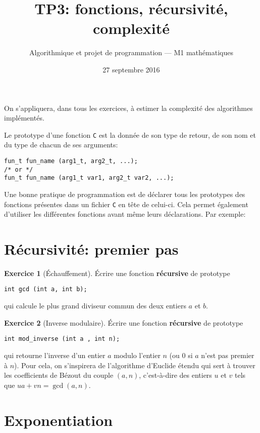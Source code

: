 \documentclass[french,a4paper]{article}
\title{\sffamily TP3: fonctions, récursivité, complexité}%
\date{27 septembre 2016}%
\author{Algorithmique et projet de programmation --- M1
  mathématiques}%
\theoremstyle{definition}
\newtheorem{exercise}{Exercice}
\theoremstyle{remark}
\begin{document}
\maketitle

On s'appliquera, dans tous les exercices, à estimer la complexité des
algorithmes implémentés.

\medskip

Le prototype d'une fonction {\tt C} est la donnée de son type de
retour, de son nom et du type de chacun de ses arguments:
\begin{lstlisting}
fun_t fun_name (arg1_t, arg2_t, ...);
/* or */
fun_t fun_name (arg1_t var1, arg2_t var2, ...);
\end{lstlisting}

Une bonne pratique de programmation est de déclarer tous les
prototypes des fonctions présentes dans un fichier {\tt C} en tête de
celui-ci. Cela permet également d'utiliser les différentes fonctions
avant même leurs déclarations. Par exemple: 


\section{Récursivité: premier pas}
\label{sec:rec}

\begin{exercise}[\'Echauffement]
  \'Ecrire une fonction {\bf récursive} de prototype
  \begin{lstlisting}
int gcd (int a, int b);
  \end{lstlisting}
  qui calcule le plus grand diviseur commun des deux entiers $a$ et
  $b$.
\end{exercise}

\begin{exercise}[Inverse modulaire]
  \'Ecrire une fonction {\bf récursive} de prototype
  \begin{lstlisting}
int mod_inverse (int a , int n);
  \end{lstlisting}
  qui retourne l'inverse d'un entier $a$ modulo l'entier $n$ (ou $0$
  si $a$ n'est pas premier à $n$). Pour cela, on s'inspirera de
  l'algorithme d'Euclide étendu qui sert à trouver les coefficients de
  Bézout du couple $(a,n)$, c'est-à-dire des entiers $u$ et $v$ tels
  que $ua+vn = \operatorname{gcd}(a,n)$.
\end{exercise}

\section{Exponentiation}
\label{sec:exp}
\end{document}
